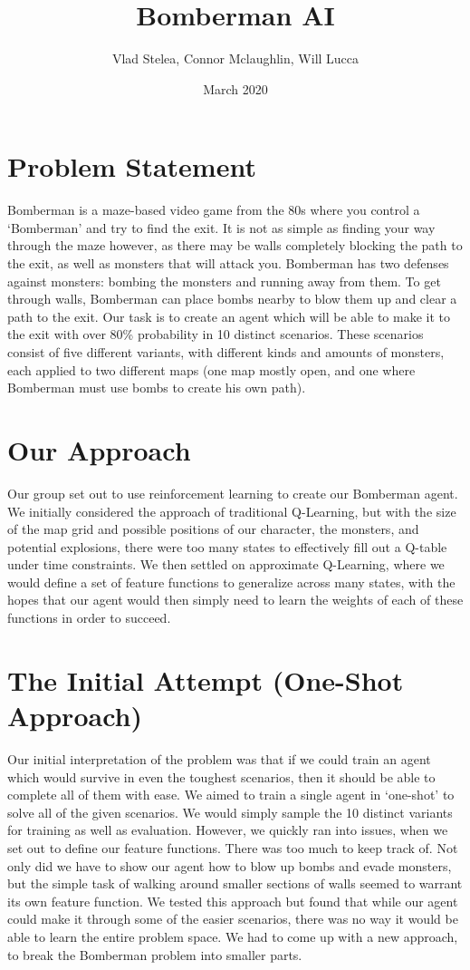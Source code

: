 \documentclass{article}
\title{Bomberman AI}
\author{Vlad Stelea, Connor Mclaughlin, Will Lucca}
\date{March 2020}
\begin{document}
\maketitle

\section{Problem Statement}
Bomberman is a maze-based video game from the 80s where you control a ‘Bomberman’ and try to find the exit. It is not as simple as finding your way through the maze however, as there may be walls completely blocking the path to the exit, as well as monsters that will attack you. Bomberman has two defenses against monsters: bombing the monsters and running away from them. To get through walls, Bomberman can place bombs nearby to blow them up and clear a path to the exit.
Our task is to create an agent which will be able to make it to the exit with over 80\% probability in 10 distinct scenarios. These scenarios consist of five different variants, with different kinds and amounts of monsters, each applied to two different maps (one map mostly open, and one where Bomberman must use bombs to create his own path). 

\section{Our Approach}
Our group set out to use reinforcement learning to create our Bomberman agent. We initially considered the approach of traditional Q-Learning, but with the size of the map grid and possible positions of our character, the monsters, and potential explosions, there were too many states to effectively fill out a Q-table under time constraints. We then settled on approximate Q-Learning, where we would define a set of feature functions to generalize across many states, with the hopes that our agent would then simply need to learn the weights of each of these functions in order to succeed. 

\section{The Initial Attempt (One-Shot Approach)}
Our initial interpretation of the problem was that if we could train an agent which would survive in even the toughest scenarios, then it should be able to complete all of them with ease. We aimed to train a single agent in ‘one-shot’ to solve all of the given scenarios. We would simply sample the 10 distinct variants for training as well as evaluation. However, we quickly ran into issues, when we set out to define our feature functions. There was too much to keep track of. Not only did we have to show our agent how to blow up bombs and evade monsters, but the simple task of walking around smaller sections of walls seemed to warrant its own feature function.
We tested this approach but found that while our agent could make it through some of the easier scenarios, there was no way it would be able to learn the entire problem space. We had to come up with a new approach, to break the Bomberman problem into smaller parts. 
\end{document}
